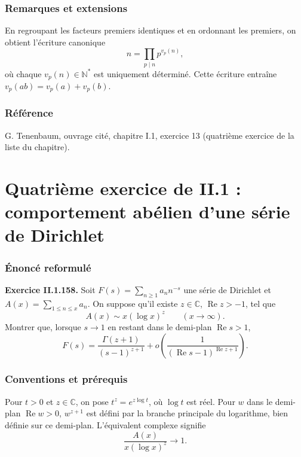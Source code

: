 \documentclass[11pt,a4paper]{article}
\newcommand{\C}{\mathbb{C}}
\newcommand{\N}{\mathbb{N}}
\DeclareMathOperator{\re}{Re}
\begin{document}
\section{Remarques et extensions}
\begin{resultbox}
En regroupant les facteurs premiers identiques et en ordonnant les premiers, on
obtient l'\'ecriture canonique
\[
 n=\prod_{p\mid n}p^{v_p(n)},
\]
o\`u chaque $v_p(n)\in\N^*$ est uniquement d\'etermin\'e. Cette \'ecriture
entra\^ine $v_p(ab)=v_p(a)+v_p(b)$.
\end{resultbox}

\section{R\'ef\'erence}
G. Tenenbaum, ouvrage cit\'e, chapitre I.1, exercice 13 (quatri\`eme exercice de
la liste du chapitre).

\part{Quatri\`eme exercice de II.1 : comportement ab\'elien d'une s\'erie de Dirichlet}

\section{\'Enonc\'e reformul\'e}
\begin{theorembox}
\textbf{Exercice II.1.158.}
Soit $F(s)=\sum_{n\geq1}a_n n^{-s}$ une s\'erie de Dirichlet et
$A(x)=\sum_{1\leq n\leq x}a_n$. On suppose qu'il existe $z\in\C$,
$\re z>-1$, tel que
\[
 A(x)\sim x(\log x)^z\qquad(x\to\infty).
\]
Montrer que, lorsque $s\to1$ en restant dans le demi-plan $\re s>1$,
\[
 F(s)=\frac{\Gamma(z+1)}{(s-1)^{z+1}}
 +o\!\left(\frac1{(\re s-1)^{\re z+1}}\right).
\]
\end{theorembox}

\section{Conventions et pr\'erequis}
Pour $t>0$ et $z\in\C$, on pose $t^z=e^{z\log t}$, o\`u $\log t$ est r\'eel.
Pour $w$ dans le demi-plan $\re w>0$, $w^{z+1}$ est d\'efini par la branche
principale du logarithme, bien d\'efinie sur ce demi-plan. L'\'equivalent complexe
signifie
\[
 \frac{A(x)}{x(\log x)^z}\longrightarrow1.
\]
\end{document}
